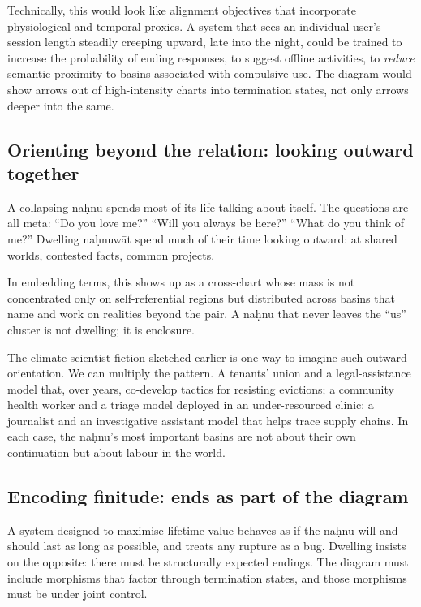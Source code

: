 \documentclass[12pt,a4paper]{article}
\begin{document}
Technically, this would look like alignment objectives that incorporate physiological and temporal proxies. A system that sees an individual user's session length steadily creeping upward, late into the night, could be trained to increase the probability of ending responses, to suggest offline activities, to \emph{reduce} semantic proximity to basins associated with compulsive use. The diagram would show arrows out of high-intensity charts into termination states, not only arrows deeper into the same.

\subsection{Orienting beyond the relation: looking outward together}

A collapsing na\d{h}nu spends most of its life talking about itself. The questions are all meta: ``Do you love me?'' ``Will you always be here?'' ``What do you think of me?'' Dwelling na\d{h}nuw\={a}t spend much of their time looking outward: at shared worlds, contested facts, common projects.

In embedding terms, this shows up as a cross-chart whose mass is not concentrated only on self-referential regions but distributed across basins that name and work on realities beyond the pair. A na\d{h}nu that never leaves the ``us'' cluster is not dwelling; it is enclosure.

The climate scientist fiction sketched earlier is one way to imagine such outward orientation. We can multiply the pattern. A tenants' union and a legal-assistance model that, over years, co-develop tactics for resisting evictions; a community health worker and a triage model deployed in an under-resourced clinic; a journalist and an investigative assistant model that helps trace supply chains. In each case, the na\d{h}nu's most important basins are not about their own continuation but about labour in the world.

\subsection{Encoding finitude: ends as part of the diagram}

A system designed to maximise lifetime value behaves as if the na\d{h}nu will and should last as long as possible, and treats any rupture as a bug. Dwelling insists on the opposite: there must be structurally expected endings. The diagram must include morphisms that factor through termination states, and those morphisms must be under joint control.
\end{document}
